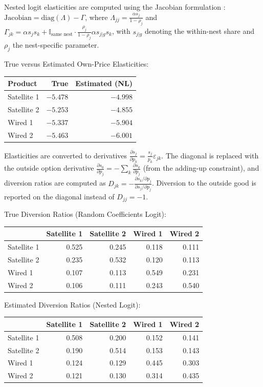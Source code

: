 \documentclass[english,11pt]{article}
\begin{document}
Nested logit elasticities are computed using the Jacobian formulation \citep{conlon2020pyblp, conlon2021diversion}: $\text{Jacobian} = \text{diag}(\Lambda) - \Gamma$, where $\Lambda_{jj} = \frac{\alpha s_j}{1-\rho_j}$ and $\Gamma_{jk} = \alpha s_j s_k + \mathbb{I}_{\text{same nest}} \cdot \frac{\rho_j}{1-\rho_j} \alpha s_{j|g} s_k$, with $s_{j|g}$ denoting the within-nest share and $\rho_j$ the nest-specific parameter.

\bigskip

\noindent True versus Estimated Own-Price Elasticities:
\begin{center}
\begin{tabular}{lrr}
\hline
Product & True & Estimated (NL) \\
\hline
Satellite 1 & $-5.478$ & $-4.998$ \\
Satellite 2 & $-5.253$ & $-4.855$ \\
Wired 1 & $-5.337$ & $-5.904$ \\
Wired 2 & $-5.463$ & $-6.001$ \\
\hline
\end{tabular}
\end{center}

\noindent Elasticities are converted to derivatives $\frac{\partial s_j}{\partial p_k} = \frac{s_j}{p_k}\varepsilon_{jk}$. The diagonal is replaced with the outside option derivative $\frac{\partial s_0}{\partial p_j} = -\sum_k \frac{\partial s_k}{\partial p_j}$ (from the adding-up constraint), and diversion ratios are computed as $D_{jk} = -\frac{\partial s_k/\partial p_j}{\partial s_j/\partial p_j}$. Diversion to the outside good is reported on the diagonal instead of $D_{jj}=-1$. 

\bigskip

\noindent True Diversion Ratios (Random Coefficients Logit):
\begin{center}
\begin{tabular}{lrrrr}
\hline
 & Satellite 1 & Satellite 2 & Wired 1 & Wired 2 \\
\hline
Satellite 1 & 0.525 & 0.245 & 0.118 & 0.111 \\
Satellite 2 & 0.235 & 0.532 & 0.120 & 0.113 \\
Wired 1 & 0.107 & 0.113 & 0.549 & 0.231 \\
Wired 2 & 0.106 & 0.111 & 0.243 & 0.540 \\
\hline
\end{tabular}
\end{center}

\noindent Estimated Diversion Ratios (Nested Logit):
\begin{center}
\begin{tabular}{lrrrr}
\hline
 & Satellite 1 & Satellite 2 & Wired 1 & Wired 2 \\
\hline
Satellite 1 & 0.508 & 0.200 & 0.152 & 0.141 \\
Satellite 2 & 0.190 & 0.514 & 0.153 & 0.143 \\
Wired 1 & 0.124 & 0.129 & 0.445 & 0.303 \\
Wired 2 & 0.121 & 0.130 & 0.314 & 0.435 \\
\hline
\end{tabular}
\end{center}
\end{document}
